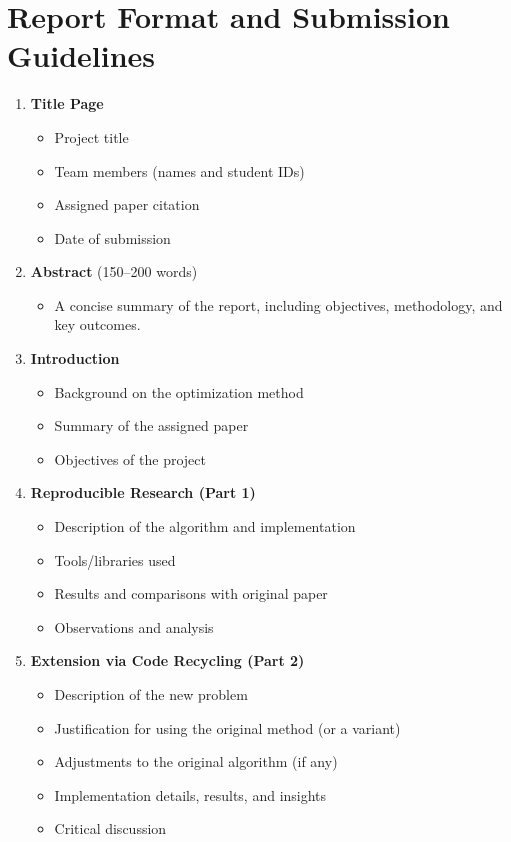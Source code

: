 \documentclass[12pt]{article}
\begin{document}
\section*{Report Format and Submission Guidelines}

\begin{enumerate}
  \item \textbf{Title Page}
  \begin{itemize}
    \item Project title
    \item Team members (names and student IDs)
    \item Assigned paper citation
    \item Date of submission
  \end{itemize}

  \item \textbf{Abstract} (150--200 words)
  \begin{itemize}
    \item A concise summary of the report, including objectives, methodology, and key outcomes.
  \end{itemize}

  \item \textbf{Introduction}
  \begin{itemize}
    \item Background on the optimization method
    \item Summary of the assigned paper
    \item Objectives of the project
  \end{itemize}

  \item \textbf{Reproducible Research (Part 1)}
  \begin{itemize}
    \item Description of the algorithm and implementation
    \item Tools/libraries used
    \item Results and comparisons with original paper
    \item Observations and analysis
  \end{itemize}

  \item \textbf{Extension via Code Recycling (Part 2)}
  \begin{itemize}
    \item Description of the new problem
    \item Justification for using the original method (or a variant)
    \item Adjustments to the original algorithm (if any)
    \item Implementation details, results, and insights
    \item Critical discussion
  \end{itemize}


\end{enumerate}
\end{document}

